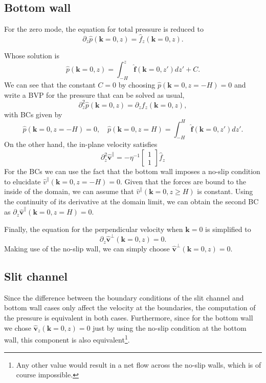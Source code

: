 \documentclass[ twoside,openright,titlepage,numbers=noenddot,%
headinclude,footinclude,cleardoublepage=empty,abstract=on,
BCOR=5mm,paper=a4,fontsize=11pt, dvipsnames
]{scrreprt}
\renewcommand{\vec}[1]{\bm{#1}}
\newcommand{\fou}[1]{\widehat{#1}}
\newcommand{\fvel}{v}
\begin{document}
\subsection*{Bottom wall}
For the zero mode, the equation for total pressure is reduced to
\begin{equation}
  \label{eq:dppressurebtm}
  \partial_z\fou{p}(\vec{k}=0, z) = \fou{f}_z(\vec{k} = 0, z).
\end{equation}

Whose solution is
\begin{equation}
  \fou{p}(\vec{k}=0, z) = \int_{-H}^z\fou{\vec{f}}(\vec{k} = 0, z')dz' + C.
\end{equation}
We can see that the constant $C=0$ by choosing $\fou{p}(\vec{k} =0, z=-H) = 0$ and write a \gls{BVP} for the pressure that can be solved as usual,
\begin{equation}
  \partial_z^2\fou{p}(\vec{k} = 0, z) = \partial_zf_z(\vec{k}=0, z),
\end{equation}
with \glspl{BC} given by
\begin{equation}
  \fou{p}(\vec{k} = 0, z=-H) = 0, \quad \fou{p}(\vec{k} = 0, z=H) = \int_{-H}^H\fou{\vec{f}}(\vec{k} = 0, z')dz'.
\end{equation}
On the other hand, the in-plane velocity satisfies
\begin{equation}
  \partial_z^2\fou{\vec{\fvel}}^{\parallel} = -\eta^{-1}
  \begin{bmatrix}
    1\\
    1
  \end{bmatrix}
  \fou{f}_z
\end{equation}
For the \glspl{BC} we can use the fact that the bottom wall imposes a no-slip condition to elucidate $\fou{\fvel}^\parallel(\vec{k} = 0, z=-H) = 0$. Given that the forces are bound to the inside of the domain, we can assume that $\fou{\fvel}^\parallel(\vec{k} = 0, z\ge H)$ is constant. Using the continuity of its derivative at the domain limit, we can obtain the second \gls{BC} as $\partial_z\fou{\vec{\fvel}}^\parallel(\vec{k} = 0, z=H) = 0$.

Finally, the equation for the perpendicular velocity when $\vec{k} = 0$ is simplified to
\begin{equation}
  \partial_z\fou{\vec{\fvel}}^\perp(\vec{k} = 0, z) = 0.
\end{equation}
Making use of the no-slip wall, we can simply choose $\fou{\vec{\fvel}}^\perp(\vec{k} = 0, z) = 0$.

\subsection*{Slit channel}
Since the difference between the boundary conditions of the slit channel and bottom wall cases only affect the velocity at the boundaries, the computation of the pressure is equivalent in both cases.
Furthermore, since for the bottom wall we chose $\fou{\vec{\fvel}}_z(\vec{k}=0, z) =0$ just by using the no-slip condition at the bottom wall, this component is also equivalent\footnote{Any other value would result in a net flow across the no-slip walls, which is of course impossible.}.
\end{document}
